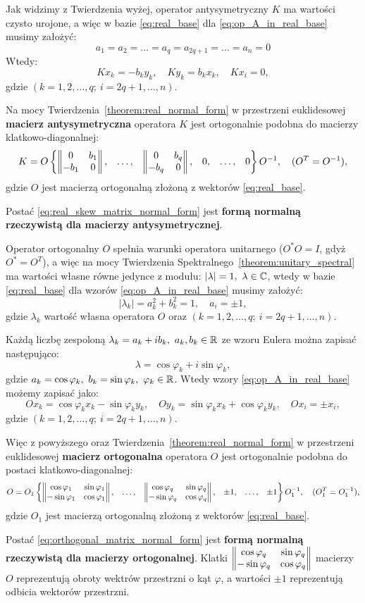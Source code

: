 Jak widzimy z Twierdzenia wyżej, operator antysymetryczny $K$ ma wartości czysto urojone, a więc w bazie \eqref{eq:real_base} dla \eqref{eq:op_A_in_real_base} musimy założyć:
$$ a_1 = a_2 = \ldots = a_q = a_{2q+1} = \ldots = a_n = 0 $$
Wtedy:
\begin{equation}
   Kx_k = - b_k y_k, \quad Ky_k = b_k x_k, \quad Kx_i = 0, 
\end{equation}
gdzie $(k = 1, 2, \ldots, q; \ i = 2q + 1, \ldots, n)$.


Na mocy Twierdzenia~\ref{theorem:real_normal_form} w przestrzeni euklidesowej \textbf{macierz antysymetryczna} operatora $K$ jest ortogonalnie podobna do macierzy klatkowo-diagonalnej:
\begin{equation}\label{eq:real_skew_matrix_normal_form}
    K =
        O
\begin{Bmatrix}
\left\| \begin{matrix} 0 & b_1\\ -b_1 & 0 \end{matrix} \right\|,
&
\ldots,
&
\left\| \begin{matrix} 0 & b_q\\ -b_q & 0 \end{matrix} \right\|,
&
0,
&
\ldots,
&
0
\end{Bmatrix}
O^{-1}, \quad (O^T = O^{-1}),
\end{equation}
gdzie $O$ jest macierzą ortogonalną złożoną z wektorów \eqref{eq:real_base}.

Postać \eqref{eq:real_skew_matrix_normal_form} jest \textbf{formą normalną rzeczywistą dla macierzy antysymetrycznej}.

Operator ortogonalny $O$ spełnia warunki operatora unitarnego ($O^*O = I$, gdyż $O^* = O^T$), a więc na mocy Twierdzenia Spektralnego~\ref{theorem:unitary_spectral} ma wartości własne równe jedynce z modułu: $|\lambda| = 1, \ \lambda \in \mathbb{C}$, wtedy w bazie \eqref{eq:real_base} dla wzorów \eqref{eq:op_A_in_real_base} musimy założyć:
$$ |\lambda_k| = a_k^2 + b_k^2 = 1, \quad a_i = \pm1, $$
gdzie $\lambda_k$ wartość własna operatora $O$ oraz $(k = 1, 2, \ldots, q; \ i = 2q + 1, \ldots, n)$.

Każdą liczbę zespoloną $\lambda_k = a_k + ib_k, \ a_k, b_k \in \mathbb{R}$ ze wzoru Eulera można zapisać następująco:
$$ \lambda = \cos{\varphi_k} + i\sin{\varphi_k}, $$ gdzie $a_k = \cos{\varphi_k}, \ b_k = \sin{\varphi_k}, \ \varphi_k \in \mathbb{R}$.
Wtedy wzory \eqref{eq:op_A_in_real_base} możemy zapisać jako:
\begin{equation}
   Ox_k = \cos{\varphi_k} x_k - \sin{\varphi_k} y_k, \quad Oy_k = \sin{\varphi_k} x_k + \cos{\varphi_k} y_k, \quad Ox_i = \pm x_i, 
\end{equation}
gdzie $(k = 1, 2, \ldots, q; \ i = 2q + 1, \ldots, n)$.

Więc z powyższego oraz Twierdzenia~\ref{theorem:real_normal_form} w przestrzeni euklidesowej \textbf{macierz ortogonalna} operatora $O$ jest ortogonalnie podobna do postaci klatkowo-diagonalnej:
\begin{equation}\label{eq:orthogonal_matrix_normal_form}
    O =
        O_1
\begin{Bmatrix}
\left\| \begin{matrix} \cos{\varphi_1} & \sin{\varphi_1}\\ -\sin{\varphi_1} & \cos{\varphi_1} \end{matrix} \right\|,
&
\ldots,
&
\left\| \begin{matrix} \cos{\varphi_q} & \sin{\varphi_q}\\ -\sin{\varphi_q} & \cos{\varphi_q} \end{matrix} \right\|,
&
\pm 1,
&
\ldots,
&
\pm 1
\end{Bmatrix}
O_1^{-1}, \quad (O_1^T = O_1^{-1}),
\end{equation}
gdzie $O_1$ jest macierzą ortogonalną złożoną z wektorów \eqref{eq:real_base}.


Postać \eqref{eq:orthogonal_matrix_normal_form} jest \textbf{formą normalną rzeczywistą dla macierzy ortogonalnej}.
Klatki $\left\| \begin{matrix} \cos{\varphi_q} & \sin{\varphi_q}\\ -\sin{\varphi_q} & \cos{\varphi_q} \end{matrix} \right\|$ macierzy $O$ reprezentują obroty wektrów przestrzni o kąt $\varphi$, a wartości $\pm1$ reprezentują odbicia wektorów przestrzni.